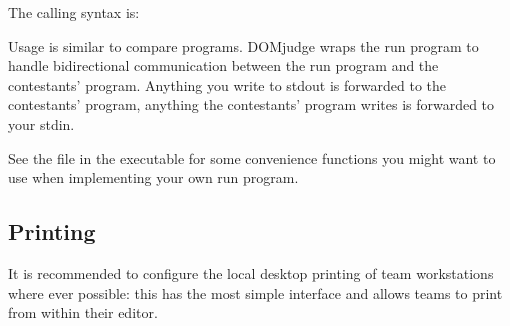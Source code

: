 \documentclass[a4paper,10pt,english,openany]{sphinxmanual}
\begin{document}
\sphinxAtStartPar
The calling syntax is:

\begin{sphinxVerbatim}[commandchars=\\\{\}]
       
\end{sphinxVerbatim}

\sphinxAtStartPar
Usage is similar to compare programs. DOMjudge wraps the run program to handle
bi\sphinxhyphen{}directional communication between the run program and the contestants’
program. Anything you write to stdout is forwarded to the contestants’ program,
anything the contestants’ program writes is forwarded to your stdin.

\sphinxAtStartPar
See the  file in the  executable for some
convenience functions you might want to use when implementing your own run
program.


\subsection{Printing}
\label{\detokenize{config-advanced:printing}}\label{\detokenize{config-advanced:id1}}
\sphinxAtStartPar
It is recommended to configure the local desktop printing of team
workstations where ever possible: this has the most simple interface
and allows teams to print from within their editor.
\end{document}
